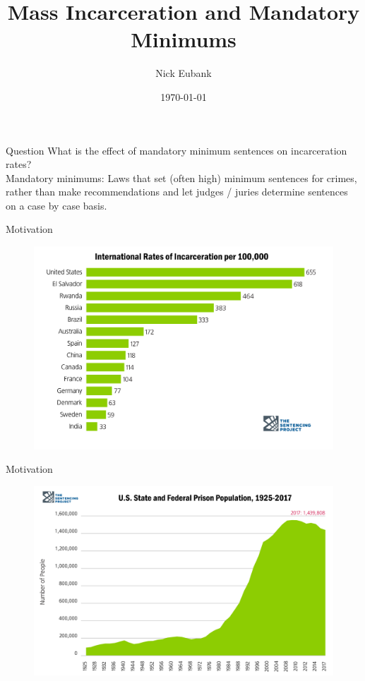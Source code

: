 \documentclass[11pt]{beamer}
\title{Mass Incarceration and Mandatory Minimums}
\author{Nick Eubank}
\date{\vspace*{.3in} \today}
\begin{document}
\begin{frame}
	\maketitle
\end{frame}

\begin{frame}[c]{Question}
What is the effect of \alert{mandatory minimum sentences} on \alert{incarceration rates?}\\
\vspace{1cm}
\pause Mandatory minimums: Laws that set (often high) minimum sentences for crimes, \\
\pause rather than make recommendations and let judges / juries determine sentences on a case by case basis.
\end{frame}

\begin{frame}[c]{Motivation}
\begin{figure}
	\includegraphics[width=\textwidth]{international_comparison.png}
\end{figure}
\end{frame}

\begin{frame}[c]{Motivation}
\begin{figure}
	\pause \includegraphics[width=\textwidth]{incarceration_trends.png}
\end{figure}
\end{frame}
\end{document}
